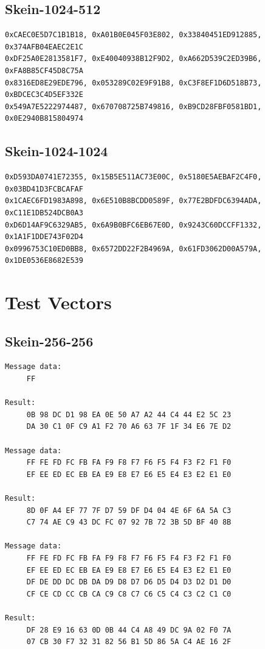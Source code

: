 \documentclass[11pt,twoside]{article}
\begin{document}
\subsection{Skein-1024-512}
\begin{verbatim}
0xCAEC0E5D7C1B1B18, 0xA01B0E045F03E802, 0x33840451ED912885, 0x374AFB04EAEC2E1C
0xDF25A0E2813581F7, 0xE40040938B12F9D2, 0xA662D539C2ED39B6, 0xFA8B85CF45D8C75A
0x8316ED8E29EDE796, 0x053289C02E9F91B8, 0xC3F8EF1D6D518B73, 0xBDCEC3C4D5EF332E
0x549A7E5222974487, 0x670708725B749816, 0xB9CD28FBF0581BD1, 0x0E2940B815804974
\end{verbatim}

\subsection{Skein-1024-1024}
\begin{verbatim}
0xD593DA0741E72355, 0x15B5E511AC73E00C, 0x5180E5AEBAF2C4F0, 0x03BD41D3FCBCAFAF
0x1CAEC6FD1983A898, 0x6E510B8BCDD0589F, 0x77E2BDFDC6394ADA, 0xC11E1DB524DCB0A3
0xD6D14AF9C6329AB5, 0x6A9B0BFC6EB67E0D, 0x9243C60DCCFF1332, 0x1A1F1DDE743F02D4
0x0996753C10ED0BB8, 0x6572DD22F2B4969A, 0x61FD3062D00A579A, 0x1DE0536E8682E539
\end{verbatim}

\section{Test Vectors}\label{sec:testvectors}

\subsection{Skein-256-256}

\begin{verbatim}
Message data:
     FF

Result:
     0B 98 DC D1 98 EA 0E 50 A7 A2 44 C4 44 E2 5C 23
     DA 30 C1 0F C9 A1 F2 70 A6 63 7F 1F 34 E6 7E D2
							 			 
Message data:				 			 
     FF FE FD FC FB FA F9 F8 F7 F6 F5 F4 F3 F2 F1 F0
     EF EE ED EC EB EA E9 E8 E7 E6 E5 E4 E3 E2 E1 E0
							 			 
Result:						 			 
     8D 0F A4 EF 77 7F D7 59 DF D4 04 4E 6F 6A 5A C3
     C7 74 AE C9 43 DC FC 07 92 7B 72 3B 5D BF 40 8B
							 			 
Message data:				 			 
     FF FE FD FC FB FA F9 F8 F7 F6 F5 F4 F3 F2 F1 F0
     EF EE ED EC EB EA E9 E8 E7 E6 E5 E4 E3 E2 E1 E0
     DF DE DD DC DB DA D9 D8 D7 D6 D5 D4 D3 D2 D1 D0
     CF CE CD CC CB CA C9 C8 C7 C6 C5 C4 C3 C2 C1 C0

Result:
     DF 28 E9 16 63 0D 0B 44 C4 A8 49 DC 9A 02 F0 7A
     07 CB 30 F7 32 31 82 56 B1 5D 86 5A C4 AE 16 2F
\end{verbatim}
\end{document}
